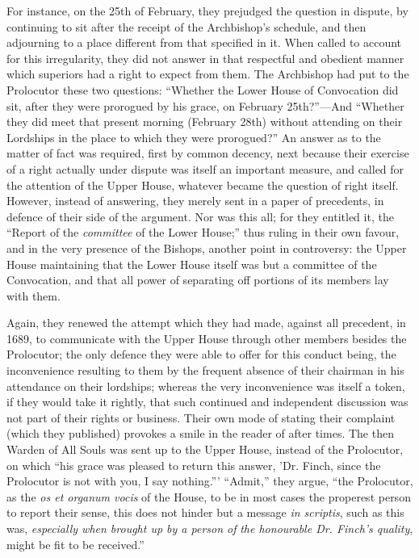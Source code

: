 For instance, on the 25th of
February, they prejudged the question in dispute, by continuing to sit
after the receipt of the Archbishop's schedule, and then adjourning to
a place different from that specified in it. When called to account
for this irregularity, they did not answer in that respectful and
obedient manner which superiors had a right to expect from them. The
Archbishop had put to the Prolocutor these two questions: ``Whether the
Lower House of Convocation did sit, after they were prorogued by his
grace, on February 25th?''—And ``Whether they did meet that present
morning (February 28th) without attending on their Lordships in the
place to which they were prorogued?'' An answer as to the matter
of fact was required, first by common decency, next because their
exercise of a right actually under dispute was itself an important
measure, and called for the attention of the Upper House, whatever
became the question of right itself. However, instead of answering,
they merely sent in a paper of precedents, in defence of their side of
the argument. Nor was this all; for they entitled it, the ``Report of
the \emph{committee} of the Lower House;'' thus ruling in their own
favour, and in the very presence of the Bishops, another point in
controversy: the Upper House maintaining that the Lower House itself
was but a committee of the Convocation, and that all power of
separating off portions of its members lay with them.

Again, they renewed the
attempt which they had made, against all precedent, in 1689, to
communicate with the Upper House through other members besides the
Prolocutor; the only defence they were able to offer for this conduct
being, the inconvenience resulting to them by the frequent absence of
their chairman in his attendance on their lordships; whereas the very
inconvenience was itself a token, if they would take it rightly, that
such continued and independent discussion was not part of their rights
or business. Their own mode of stating their complaint (which they
published) provokes a smile in the reader of after times. The then
Warden of All Souls was sent up to the Upper House, instead of the
Prolocutor, on which ``his grace was pleased to return this answer,
'Dr. Finch, since the Prolocutor is not with you, I say nothing.''' ``Admit,''
they argue, ``the Prolocutor, as the \emph{os et organum vocis} of the
House, to be in most cases the properest person to report their sense,
this does not hinder but a message \emph{in scriptis}, such as this
was, \emph{especially when brought up by a person of} \emph{the
honourable Dr. Finch's quality}, might be fit to be received.''

